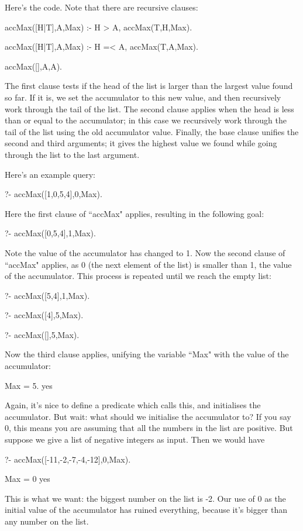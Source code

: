 Here's the code.  Note that there are  recursive clauses:
\begin{LPNcodedisplay}
accMax([H|T],A,Max) :-
   H > A,
   accMax(T,H,Max).

accMax([H|T],A,Max) :-
   H =< A,
   accMax(T,A,Max).

accMax([],A,A).
\end{LPNcodedisplay}
The first clause tests if the head of the list is larger than the
largest value found so far.  If it is, we set the accumulator to this
new value, and then recursively work through the tail of the list.
The second clause applies when the head is less than or equal to the
accumulator; in this case we recursively work through the tail of the
list using the old accumulator value.  Finally, the base clause
unifies the second and third arguments; it gives the highest value we
found while going through the list to the last argument.

Here's an
example query:
\begin{LPNcodedisplay}
?- accMax([1,0,5,4],0,Max).
\end{LPNcodedisplay}
Here the first clause of ``accMax" applies, resulting in the following
goal:
\begin{LPNcodedisplay}
?- accMax([0,5,4],1,Max).
\end{LPNcodedisplay}
Note the value of the accumulator has changed to 1.  Now the second
clause of ``accMax" applies, as 0 (the next element of the list) is
smaller than 1, the value of the accumulator.
This process is repeated until
we reach the empty list:
\begin{LPNcodedisplay}
?- accMax([5,4],1,Max).

?- accMax([4],5,Max).

?- accMax([],5,Max).
\end{LPNcodedisplay}
Now the third clause applies, unifying the variable ``Max"
with the value of the accumulator:
\begin{LPNcodedisplay}
Max = 5.
yes
\end{LPNcodedisplay}

Again, it's nice to define a predicate which calls this, and
initialises the accumulator.  But wait: what should we initialise the
accumulator to?  If you say 0, this means you are assuming that all
the numbers in the list are positive. But suppose we give
a list of negative integers as input. Then we would have
\begin{LPNcodedisplay}
?- accMax([-11,-2,-7,-4,-12],0,Max).

Max = 0
yes
\end{LPNcodedisplay}
This is  what we want: the biggest number on the list is
-2.  Our use of 0 as the initial value of the accumulator has ruined
everything, because it's bigger than any number on the list.

